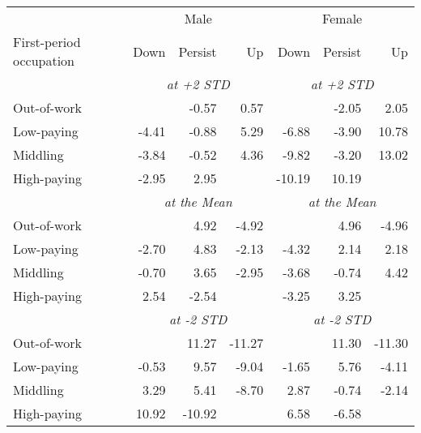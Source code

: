 
\begin{tabular}{lrrrrrr}
\toprule
\multicolumn{1}{c}{} & \multicolumn{3}{c}{Male} & \multicolumn{3}{c}{Female} \\
\cmidrule(l{3pt}r{3pt}){2-4} \cmidrule(l{3pt}r{3pt}){5-7}
First-period occupation & Down & Persist & Up & Down & Persist & Up\\
\midrule
& \multicolumn{3}{c}{\textit{at +2 STD}} & \multicolumn{3}{c}{\textit{at +2 STD}}\\ 
\midrule
Out-of-work &  & -0.57 & 0.57 &  & -2.05 & 2.05\\
Low-paying & -4.41 & -0.88 & 5.29 & -6.88 & -3.90 & 10.78\\
Middling & -3.84 & -0.52 & 4.36 & -9.82 & -3.20 & 13.02\\
High-paying & -2.95 & 2.95 &  & -10.19 & 10.19 & \\
\midrule 
 & \multicolumn{3}{c}{\textit{at the Mean}} & \multicolumn{3}{c}{\textit{at the Mean}}\\ 
\midrule
Out-of-work &  & 4.92 & -4.92 &  & 4.96 & -4.96\\
Low-paying & -2.70 & 4.83 & -2.13 & -4.32 & 2.14 & 2.18\\
Middling & -0.70 & 3.65 & -2.95 & -3.68 & -0.74 & 4.42\\
High-paying & 2.54 & -2.54 &  & -3.25 & 3.25 & \\
\midrule 
 & \multicolumn{3}{c}{\textit{at -2 STD}} & \multicolumn{3}{c}{\textit{at -2 STD}}\\ 
\midrule
Out-of-work &  & 11.27 & -11.27 &  & 11.30 & -11.30\\
Low-paying & -0.53 & 9.57 & -9.04 & -1.65 & 5.76 & -4.11\\
Middling & 3.29 & 5.41 & -8.70 & 2.87 & -0.74 & -2.14\\
High-paying & 10.92 & -10.92 &  & 6.58 & -6.58 & \\
\bottomrule
\end{tabular}
